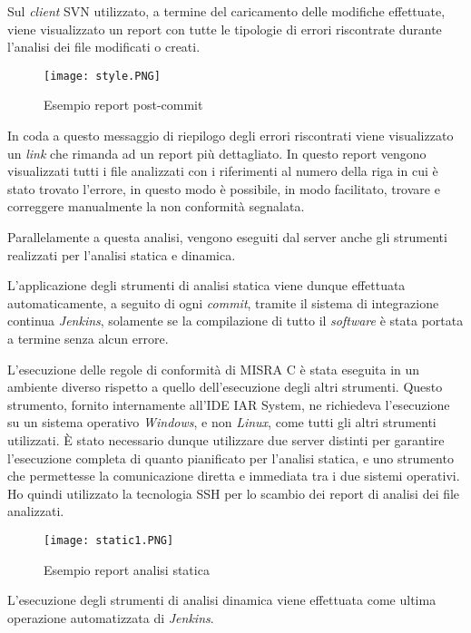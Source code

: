 Sul \textit{client} SVN utilizzato, a termine del caricamento delle modifiche effettuate, viene visualizzato un report con tutte le tipologie di errori riscontrate durante l'analisi dei file modificati o creati.

\begin{figure}[H]
  \centering
  \texttt{[image: style.PNG]}
  \caption{Esempio report post-commit}
\end{figure}

In coda a questo messaggio di riepilogo degli errori riscontrati viene visualizzato un \textit{link} che rimanda ad un report più dettagliato. In questo report vengono visualizzati tutti i file analizzati con i riferimenti al numero della riga in cui è stato trovato l'errore, in questo modo è possibile, in modo facilitato, trovare e correggere manualmente la non conformità segnalata.

\bigskip

Parallelamente a questa analisi, vengono eseguiti dal server anche gli strumenti realizzati per l'analisi statica e dinamica.

L'applicazione degli strumenti di analisi statica viene dunque effettuata automaticamente, a seguito di ogni \textit{commit}, tramite il sistema di integrazione continua \textit{Jenkins}, solamente se la compilazione di tutto il \textit{software} è stata portata a termine senza alcun errore.

L'esecuzione delle regole di conformità di MISRA C è stata eseguita in un ambiente diverso rispetto a quello dell'esecuzione degli altri strumenti. Questo strumento, fornito internamente all'IDE IAR System, ne richiedeva l'esecuzione su un sistema operativo \textit{Windows}, e non \textit{Linux}, come tutti gli altri strumenti utilizzati. È stato necessario dunque utilizzare due server distinti per garantire l'esecuzione completa di quanto pianificato per l'analisi statica, e uno strumento che permettesse la comunicazione diretta e immediata tra i due sistemi operativi. Ho quindi utilizzato la tecnologia SSH per lo scambio dei report di analisi dei file analizzati.

\begin{figure}[H]
  \centering
  \texttt{[image: static1.PNG]}
  \caption{Esempio report analisi statica}
\end{figure}

L'esecuzione degli strumenti di analisi dinamica viene effettuata come ultima operazione automatizzata di \textit{Jenkins}.


